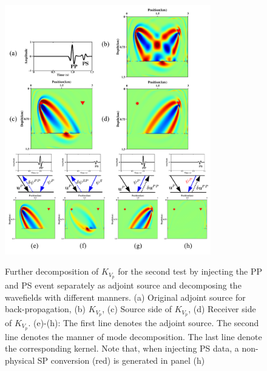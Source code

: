 \begin{figure}[!htb]
   \centering
   {\includegraphics[width=0.8\textwidth]{Kernel/Combinations/K_vp.pdf}}
   \caption{
   Further decomposition of $K_{V_p}$ for the second test by injecting the PP
   and PS event separately as adjoint source and decomposing the wavefields with different manners. 
   (a) Original adjoint source
   for back-propagation, (b) $K_{V_p}$, (c) Source side of $K_{V_p}$, (d)
   Receiver side of $K_{V_p}$. (e)-(h): The first line denotes the adjoint source. 
   The second line denotes the manner of mode decomposition. The last line
   denote the corresponding kernel. Note that, when injecting PS data, a
   non-physical SP conversion (red) is generated
   in panel (h)}
   \label{fig:kernel_vp_decomp}
\end{figure}
